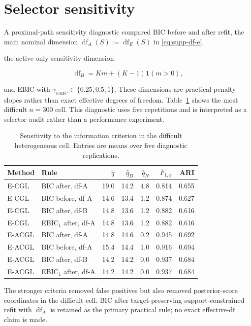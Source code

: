 \documentclass[preprint,12pt,authoryear]{elsarticle}
\begin{document}
\section{Selector sensitivity}
\label{sec:s-selector-sensitivity}

A proximal-path sensitivity diagnostic compared BIC before and after refit,
the main nominal dimension
$\operatorname{df}_A(S):=\operatorname{df}_E(S)$ in
\eqref{eq:supp-df-e},

the active-only sensitivity dimension

\[
\operatorname{df}_B=Km+(K-1)\mathbf 1(m>0),
\]

and EBIC with
$\gamma_{\mathrm{EBIC}}\in\{0.25,0.5,1\}$. These dimensions are practical
penalty slopes rather than exact effective degrees of freedom.
Table~\ref{tab:s-selector-sensitivity} shows the most difficult
$n=300$ cell. This diagnostic uses five repetitions and is interpreted as a
selector audit rather than a performance experiment.

\begin{table}[H]
\centering
\footnotesize
\setlength{\tabcolsep}{3pt}
\caption{Sensitivity to the information criterion in the difficult
heterogeneous cell. Entries are means over five diagnostic replications.}
\label{tab:s-selector-sensitivity}
\begin{tabular}{llrrrrr}
\toprule
Method & Rule & $\widehat q$ & $\widehat q_D$ & $\widehat q_N$ & $F_{1,\eta}$ & ARI \\
\midrule
E-CGL & BIC after, df-A & 19.0 & 14.2 & 4.8 & 0.814 & 0.655 \\
E-CGL & BIC before, df-A & 14.6 & 13.4 & 1.2 & 0.874 & 0.627 \\
E-CGL & BIC after, df-B & 14.8 & 13.6 & 1.2 & 0.882 & 0.616 \\
E-CGL & EBIC$_1$ after, df-A & 14.8 & 13.6 & 1.2 & 0.882 & 0.616 \\
E-ACGL & BIC after, df-A & 14.8 & 14.6 & 0.2 & 0.945 & 0.692 \\
E-ACGL & BIC before, df-A & 15.4 & 14.4 & 1.0 & 0.916 & 0.694 \\
E-ACGL & BIC after, df-B & 14.2 & 14.2 & 0.0 & 0.937 & 0.684 \\
E-ACGL & EBIC$_1$ after, df-A & 14.2 & 14.2 & 0.0 & 0.937 & 0.684 \\
\bottomrule
\end{tabular}
\end{table}

The stronger criteria removed false positives but also removed posterior-score
coordinates in the difficult cell. BIC after target-preserving
support-constrained refit with $\operatorname{df}_A$ is retained
as the primary practical rule; no exact effective-df claim is made.
\end{document}
